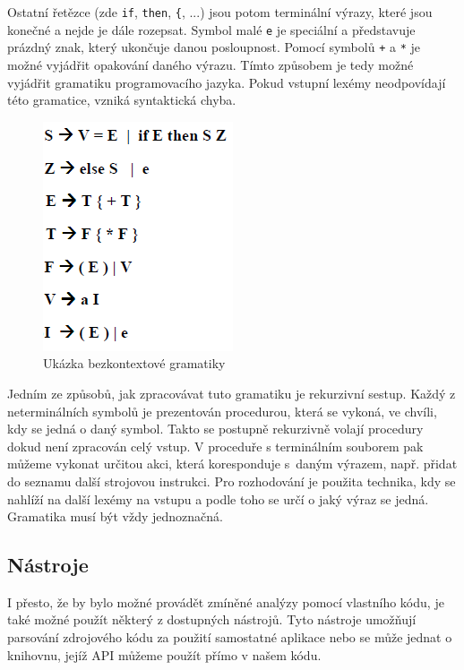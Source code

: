 			Ostatní řetězce (zde \texttt{if}, \texttt{then}, \texttt{\{}, ...) jsou potom terminální výrazy, které jsou konečné a nejde je dále rozepsat. Symbol malé \texttt{e} je speciální a představuje prázdný znak, který ukončuje danou posloupnost. Pomocí symbolů \texttt{+} a \texttt{*} je možné vyjádřit opakování daného výrazu. Tímto způsobem je tedy možné vyjádřit gramatiku programovacího jazyka. Pokud vstupní lexémy neodpovídají této gramatice, vzniká syntaktická chyba.
			
			\begin{figure}[!htb]
					\centering
					\includegraphics{img/gramatika.png}
					\caption[bkg]{Ukázka bezkontextové gramatiky}
					\label{bkg}
				\endminipage\hfill
			\end{figure}
			
			Jedním ze způsobů, jak zpracovávat tuto gramatiku je rekurzivní sestup. Každý z neterminálních symbolů je prezentován procedurou, která se vykoná, ve chvíli, kdy se jedná o daný symbol. Takto se postupně rekurzivně volají procedury dokud není zpracován celý vstup. V proceduře s terminálním souborem pak můžeme vykonat určitou akci, která koresponduje s~daným výrazem, např. přidat do seznamu další strojovou instrukci. Pro rozhodování je použita technika, kdy se nahlíží na další lexémy na vstupu a podle toho se určí o jaký výraz se jedná. Gramatika musí být vždy jednoznačná.
			
		\subsection{Nástroje}
			I přesto, že by bylo možné provádět zmíněné analýzy pomocí vlastního kódu, je také možné použít některý z dostupných nástrojů. Tyto nástroje umožňují parsování zdrojového kódu za použití samostatné aplikace nebo se může jednat o knihovnu, jejíž API můžeme použít přímo v našem kódu.
			
